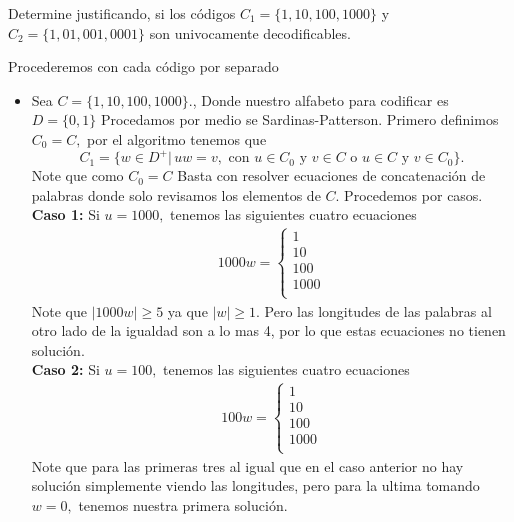 
Determine justificando, si los códigos $C_1 = \{1, 10, 100, 1000\}$ y $C_2 = \{1, 01, 001, 0001\}$ son univocamente decodificables.
    \begin{sols}
     Procederemos con cada código por separado   
    
    \begin{itemize}
        \item Sea $C=\{1,10,100,1000\}.$, Donde nuestro alfabeto para codificar es $D=\{0,1\}$ Procedamos por medio se Sardinas-Patterson. Primero definimos $C_0=C,$ por el algoritmo tenemos que 
        $$C_1=\{w\in D^+|\,uw=v, \text{ con } u\in C_0 \text{ y } v\in C \text{ o } u\in C \text{ y } v\in C_0 \}.$$
        Note que como $C_0=C$ Basta con resolver ecuaciones de concatenación de palabras donde solo revisamos los elementos de $C.$ Procedemos por casos.\\

        \textbf{Caso 1:} Si $u=1000,$ tenemos las siguientes cuatro ecuaciones
        \begin{align*}
            1000w=\begin{cases}
                1\\
                10\\
                100\\
                1000\\
            \end{cases}
        \end{align*}
        Note que $|1000w|\geq 5$ ya que $|w|\geq1.$ Pero las longitudes de las palabras al otro lado de la igualdad son a lo mas 4, por lo que estas ecuaciones no tienen solución.\\
        
        \textbf{Caso 2:}
        Si $u=100,$
        tenemos las siguientes cuatro ecuaciones
        \begin{align*}
            100w=\begin{cases}
                1\\
                10\\
                100\\
                1000\\
            \end{cases}
        \end{align*}
        Note que para las primeras tres al igual que en el caso anterior no hay solución simplemente viendo las longitudes, pero para la ultima tomando $w=0,$ tenemos nuestra primera solución.\\


\end{itemize}
\end{sols}
